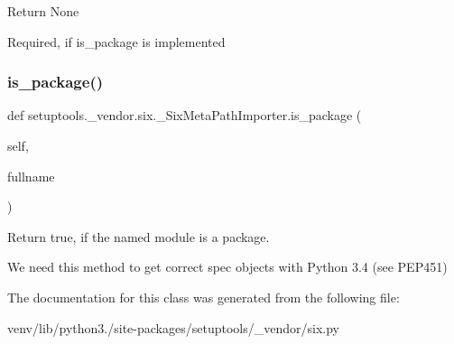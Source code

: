 \begin{DoxyVerb}Return None

Required, if is_package is implemented\end{DoxyVerb}
 \mbox{\label{classsetuptools_1_1__vendor_1_1six_1_1___six_meta_path_importer_ad711f81f0155bb835c9b80d4ace66ea9}} 
\subsubsection{\texorpdfstring{is\+\_\+package()}{is\_package()}}
{\footnotesize\ttfamily def setuptools.\+\_\+vendor.\+six.\+\_\+\+Six\+Meta\+Path\+Importer.\+is\+\_\+package (\begin{DoxyParamCaption}\item[{}]{self,  }\item[{}]{fullname }\end{DoxyParamCaption})}

\begin{DoxyVerb}Return true, if the named module is a package.

We need this method to get correct spec objects with
Python 3.4 (see PEP451)
\end{DoxyVerb}
 

The documentation for this class was generated from the following file\+:\begin{DoxyCompactItemize}
\item 
venv/lib/python3./site-\/packages/setuptools/\+\_\+vendor/six.\+py\end{DoxyCompactItemize}
